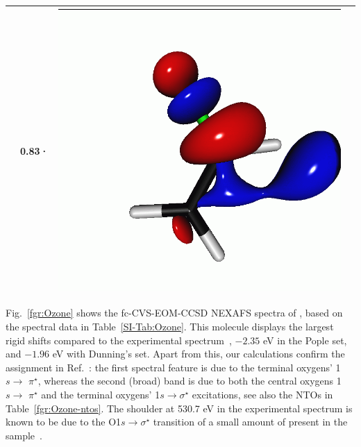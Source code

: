 \documentclass[journal=jctcce,manuscript=article]{achemso}
\begin{document}
\begin{table}[H]
\begin{tabular}{ c | c c c }
\begin{minipage}{0.2\textwidth}
     \end{minipage}
     & 0.83·
     &  \begin{minipage}{0.2\textwidth}
         \centering
         \includegraphics[scale=0.10]{NTO/CH2CHF/CH2CHF_F_3p.png}
     \end{minipage}
     \\
     \hline
 \end{tabular}
 \end{table}
%

\clearpage
Fig.~\ref{fgr:Ozone} shows the fc-CVS-EOM-CCSD NEXAFS spectra of , based on the spectral data in Table~\ref{SI-Tab:Ozone}. This molecule displays the largest rigid shifts compared to the experimental spectrum~\cite{ozone_nexafs_xps}, $-2.35$ eV in the Pople set, and $-1.96$ eV with Dunning's set.
Apart from this, our calculations confirm the assignment in Ref.~: the first spectral feature is due to the terminal oxygens' 1$s\to$ $\pi^\star$, whereas the second (broad) band is due to
both the central oxygens 1$s\to$ $\pi^\star$ and the terminal oxygens' 1$s \to \sigma^\star$ excitations, see also the NTOs in Table~\ref{fgr:Ozone-ntos}.
The shoulder at 530.7 eV in the experimental spectrum is known to be due to the O1$s\to \sigma^\star$ transition of a small amount of  present in the sample~\cite{ozone_nexafs_xps}.
\end{document}
